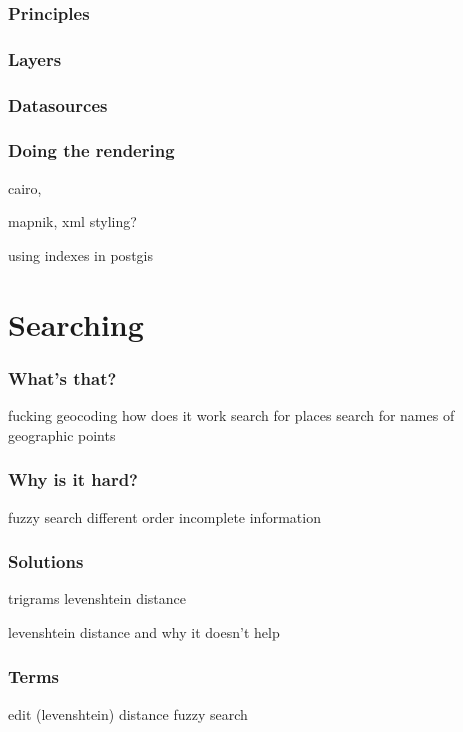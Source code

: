 \documentclass{beamer}
\begin{document}
\begin{frame}
  \frametitle{Principles}
\end{frame}

\begin{frame}
  \frametitle{Layers}
\end{frame}

\begin{frame}
  \frametitle{Datasources}
\end{frame}

\begin{frame}
  \frametitle{Doing the rendering}
  cairo,
\end{frame}

\begin{frame}
  mapnik, xml styling?
\end{frame}

\begin{frame}
  using indexes in postgis
\end{frame}

\begin{frame}

\end{frame}

\section{Searching}

\begin{frame}
  \frametitle{What's that?}
  fucking geocoding how does it work
  search for places
  search for names of geographic points
\end{frame}

\begin{frame}
  \frametitle{Why is it hard?}
  fuzzy search
  different order
  incomplete information
\end{frame}

\begin{frame}
  \frametitle{Solutions}
  trigrams
  levenshtein distance
\end{frame}

\begin{frame}
  levenshtein distance and why it doesn't help
\end{frame}

\begin{frame}
  \frametitle{Terms}
  edit (levenshtein) distance
  fuzzy search
\end{frame}
\end{document}
